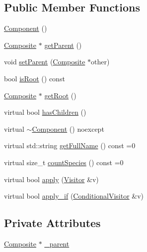\subsection*{Public Member Functions}
\begin{DoxyCompactItemize}
\item 
\hyperlink{classchem_1_1Component_a2c7265280625c13151d52a500bcc3095}{Component} ()
\item 
\hyperlink{classchem_1_1Composite}{Composite} $\ast$ \hyperlink{classchem_1_1Component_a32812270ee52f07ceae2194c56864fd6}{get\-Parent} ()
\item 
void \hyperlink{classchem_1_1Component_a1f4e4d1566f1d3026f1e2a14fa3dffd9}{set\-Parent} (\hyperlink{classchem_1_1Composite}{Composite} $\ast$other)
\item 
bool \hyperlink{classchem_1_1Component_a75cd13a0d884f82fcddd574de33fbfe6}{is\-Root} () const 
\item 
\hyperlink{classchem_1_1Composite}{Composite} $\ast$ \hyperlink{classchem_1_1Component_a7f1166f8fb4c9526cd1794ec3c2714f5}{get\-Root} ()
\item 
virtual bool \hyperlink{classchem_1_1Component_aca92f700484a1ad36c2e656e307fe263}{has\-Children} ()
\item 
virtual \hyperlink{classchem_1_1Component_a9a468e72232a30a69d4432d13ac5ffa9}{$\sim$\-Component} () noexcept
\item 
virtual std\-::string \hyperlink{classchem_1_1Component_aa98580b14e0246ca9840d5b76f9b4a43}{get\-Full\-Name} () const =0
\item 
virtual size\-\_\-t \hyperlink{classchem_1_1Component_ab39d0fd77db206513e03aee1c0aeb459}{count\-Species} () const =0
\item 
virtual bool \hyperlink{classchem_1_1Component_ae9efcf2fb203ab7514f81f04d7e4dec2}{apply} (\hyperlink{classchem_1_1Visitor}{Visitor} \&v)
\item 
virtual bool \hyperlink{classchem_1_1Component_ac40e9d75a554324ba1d007a2d5234a38}{apply\-\_\-if} (\hyperlink{classchem_1_1ConditionalVisitor}{Conditional\-Visitor} \&v)
\end{DoxyCompactItemize}
\subsection*{Private Attributes}
\begin{DoxyCompactItemize}
\item 
\hyperlink{classchem_1_1Composite}{Composite} $\ast$ \hyperlink{classchem_1_1Component_a5da4c5a0d857620fe3e3cf7d8d06ec26}{\-\_\-parent}
\end{DoxyCompactItemize}


